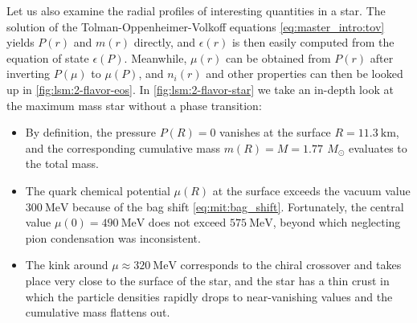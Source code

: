 Let us also examine the radial profiles of interesting quantities in a star.
The solution of the Tolman-Oppenheimer-Volkoff equations \eqref{eq:master_intro:tov} yields $P(r)$ and $m(r)$ directly,
and $\epsilon(r)$ is then easily computed from the equation of state $\epsilon(P)$.
Meanwhile, $\mu(r)$ can be obtained from $P(r)$ after inverting $P(\mu)$ to $\mu(P)$,
and $n_i(r)$ and other properties can then be looked up in \cref{fig:lsm:2-flavor-eos}.
In \cref{fig:lsm:2-flavor-star} we take an in-depth look at the maximum mass star without a phase transition:
\begin{itemize}
\label{list:lsm:2-flavor-star-discussion}
\item By definition, the pressure $P(R)=0$ vanishes at the surface $R=\SI{11.3}{\kilo\meter}$,
      and the corresponding cumulative mass $m(R)=M=\SI{1.77}{}\,M_\odot$ evaluates to the total mass.
\item The quark chemical potential $\mu(R)$ at the surface exceeds the vacuum value $\SI{300}{\mega\electronvolt}$ because of the bag shift \eqref{eq:mit:bag_shift}.
      Fortunately, the central value $\mu(0) = \SI{490}{\mega\electronvolt}$ does not exceed $\SI{575}{\mega\electronvolt}$,
      beyond which neglecting pion condensation was inconsistent. %
\item The kink around $\mu \approx \SI{320}{\mega\electronvolt}$ corresponds to the chiral crossover and takes place very close to the surface of the star,
      and the star has a thin crust in which the particle densities rapidly drops to near-vanishing values and the cumulative mass flattens out.
\end{itemize}

